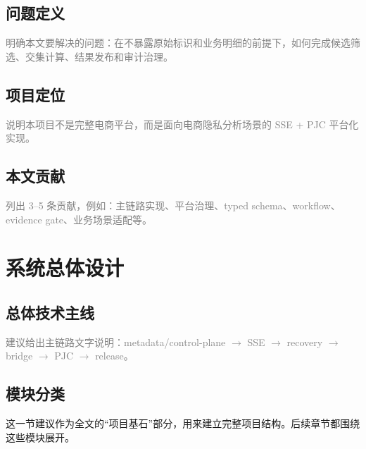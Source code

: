 \documentclass[UTF8,a4paper,12pt,oneside]{ctexrep}
\newcommand{\placeholder}[1]{\textcolor{gray}{#1}}
\begin{document}
\section{问题定义}
\placeholder{明确本文要解决的问题：在不暴露原始标识和业务明细的前提下，如何完成候选筛选、交集计算、结果发布和审计治理。}

\section{项目定位}
\placeholder{说明本项目不是完整电商平台，而是面向电商隐私分析场景的 SSE + PJC 平台化实现。}

\section{本文贡献}
\placeholder{列出 3--5 条贡献，例如：主链路实现、平台治理、typed schema、workflow、evidence gate、业务场景适配等。}

\chapter{系统总体设计}

\section{总体技术主线}
\placeholder{建议给出主链路文字说明：metadata/control-plane $\rightarrow$ SSE $\rightarrow$ recovery $\rightarrow$ bridge $\rightarrow$ PJC $\rightarrow$ release。}

\section{模块分类}

这一节建议作为全文的“项目基石”部分，用来建立完整项目结构。后续章节都围绕这些模块展开。
\end{document}
